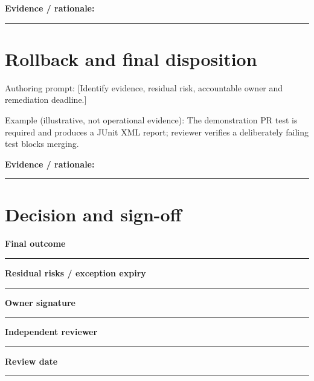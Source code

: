 \documentclass[11pt,letterpaper]{article}
\begin{document}
\noindent\textbf{Evidence / rationale:}\par\nobreak\vspace{8pt}\noindent\rule{0.93\linewidth}{0.4pt}\par\vspace{14pt}
\section{Rollback and final disposition}
Authoring prompt: [Identify evidence, residual risk, accountable owner and remediation deadline.]

Example (illustrative, not operational evidence): The demonstration PR test is required and produces a JUnit XML report; reviewer verifies a deliberately failing test blocks merging.

\noindent\textbf{Evidence / rationale:}\par\nobreak\vspace{8pt}\noindent\rule{0.93\linewidth}{0.4pt}\par\vspace{14pt}
\section{Decision and sign-off}
\noindent\textbf{Final outcome}\par\nobreak\vspace{6pt}\noindent\rule{0.93\linewidth}{0.4pt}\par\vspace{14pt}
\noindent\textbf{Residual risks / exception expiry}\par\nobreak\vspace{6pt}\noindent\rule{0.93\linewidth}{0.4pt}\par\vspace{14pt}
\noindent\textbf{Owner signature}\par\nobreak\vspace{6pt}\noindent\rule{0.93\linewidth}{0.4pt}\par\vspace{14pt}
\noindent\textbf{Independent reviewer}\par\nobreak\vspace{6pt}\noindent\rule{0.93\linewidth}{0.4pt}\par\vspace{14pt}
\noindent\textbf{Review date}\par\nobreak\vspace{6pt}\noindent\rule{0.93\linewidth}{0.4pt}\par\vspace{14pt}
\end{document}
